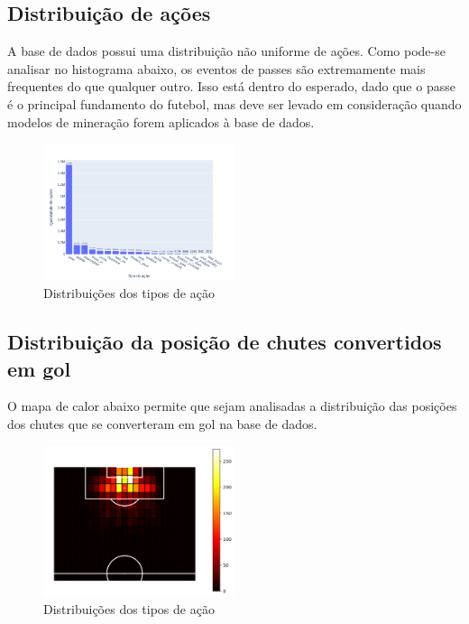 \documentclass{article}
\begin{document}
\subsection{Distribuição de ações}

A base de dados possui uma distribuição não uniforme de ações. Como pode-se
analisar no histograma abaixo, os eventos de passes são extremamente mais
frequentes do que qualquer outro. Isso está dentro do esperado, dado que o
passe é o principal fundamento do futebol, mas deve ser levado em consideração
quando modelos de mineração forem aplicados à base de dados.

\begin{figure}[H]
	\centering
	\includegraphics[width=0.5\textwidth]{images/action_distribution.png}
	\caption{Distribuições dos tipos de ação}
	\label{fig:action_distribution}
\end{figure}

\subsection{Distribuição da posição de chutes convertidos em gol}

O mapa de calor abaixo permite que sejam analisadas a distribuição das posições dos chutes que se converteram em gol
na base de dados.

\begin{figure}[H]
	\centering
	\includegraphics[width=0.5\textwidth]{images/goal_position_heatmap.png}
	\caption{Distribuições dos tipos de ação}
	\label{fig:heatmap_goals}
\end{figure}
\end{document}
